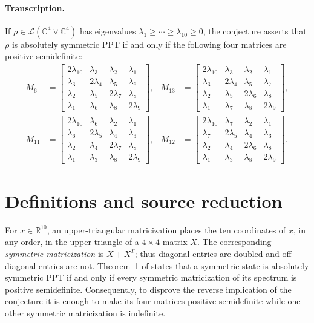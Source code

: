 \documentclass[10pt]{article}
\newcommand{\C}{\mathbb C}
\begin{document}
\paragraph{Transcription.}
If $\rho\in\mathcal L(\C^4\vee\C^4)$ has eigenvalues
$\lambda_1\geq\cdots\geq\lambda_{10}\geq0$, the conjecture asserts that
$\rho$ is absolutely symmetric PPT if and only if the following four matrices
are positive semidefinite:
\begin{align*}
M_6&=\begin{bmatrix}
2\lambda_{10}&\lambda_3&\lambda_2&\lambda_1\\
\lambda_3&2\lambda_4&\lambda_5&\lambda_6\\
\lambda_2&\lambda_5&2\lambda_7&\lambda_8\\
\lambda_1&\lambda_6&\lambda_8&2\lambda_9
\end{bmatrix},&
M_{13}&=\begin{bmatrix}
2\lambda_{10}&\lambda_3&\lambda_2&\lambda_1\\
\lambda_3&2\lambda_4&\lambda_5&\lambda_7\\
\lambda_2&\lambda_5&2\lambda_6&\lambda_8\\
\lambda_1&\lambda_7&\lambda_8&2\lambda_9
\end{bmatrix},\\[2mm]
M_{11}&=\begin{bmatrix}
2\lambda_{10}&\lambda_6&\lambda_2&\lambda_1\\
\lambda_6&2\lambda_5&\lambda_4&\lambda_3\\
\lambda_2&\lambda_4&2\lambda_7&\lambda_8\\
\lambda_1&\lambda_3&\lambda_8&2\lambda_9
\end{bmatrix},&
M_{12}&=\begin{bmatrix}
2\lambda_{10}&\lambda_7&\lambda_2&\lambda_1\\
\lambda_7&2\lambda_5&\lambda_4&\lambda_3\\
\lambda_2&\lambda_4&2\lambda_6&\lambda_8\\
\lambda_1&\lambda_3&\lambda_8&2\lambda_9
\end{bmatrix}.
\end{align*}

\section{Definitions and source reduction}
For $x\in\mathbb R^{10}$, an upper-triangular matricization places the ten
coordinates of $x$, in any order, in the upper triangle of a $4\times4$
matrix $X$.  The corresponding \emph{symmetric matricization} is $X+X^T$;
thus diagonal entries are doubled and off-diagonal entries are not.
Theorem~1 of \cite{CJMP} states that a symmetric state is absolutely symmetric
PPT if and only if every symmetric matricization of its spectrum is positive
semidefinite.  Consequently, to disprove the reverse implication of the
conjecture it is enough to make its four matrices positive semidefinite while
one other symmetric matricization is indefinite.
\end{document}
